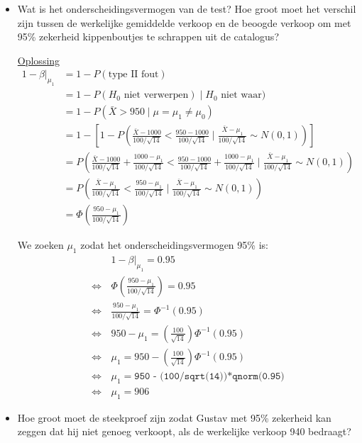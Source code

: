 \documentclass[kulak]{kulakarticle} %
\begin{document}
\begin{itemize}
	\item Wat is het onderscheidingsvermogen van de test? Hoe groot moet het verschil zijn tussen de werkelijke gemiddelde verkoop en de beoogde verkoop om met 95\% zekerheid kippenboutjes te schrappen uit de catalogus?

	\underline{Oplossing}
	\begin{align*}
		1-\beta |_{\mu_1} & = 1-P(\text{type II fout})                                                            \\
		        & = 1-P(H_0 \text{ niet verwerpen}) \mid H_0 \text{ niet waar})                         \\
		        & = 1-P\left(\bar{X}>950 \mid \mu = \mu_1 \neq \mu_0 \right)     \\
		        & = 1-\left[1-P\left(\frac{\bar{X}-1000}{100/\sqrt{14}}<\frac{950-1000}{100/\sqrt{14}} \mid \frac{\bar{X}-\mu_1}{100/\sqrt{14}}\sim N(0,1) \right)\right] \\
		        & = P\left(\frac{\bar{X}-1000}{100/\sqrt{14}}+\frac{1000-\mu_1}{100/\sqrt{14}}<\frac{950-1000}{100/\sqrt{14}}+\frac{1000-\mu_1}{100/\sqrt{14}} \mid \frac{\bar{X}-\mu_1}{100/\sqrt{14}}\sim N(0,1) \right) \\
		        & = P\left(\frac{\bar{X}-\mu_1}{100/\sqrt{14}} < \frac{950-\mu_1}{100/\sqrt{14}} \mid \frac{\bar{X}-\mu_1}{100/\sqrt{14}}\sim N(0,1) \right) \\
		        & = \Phi\left(\frac{950-\mu_1}{100/\sqrt{14}} \right)
	\end{align*}

	We zoeken \(\mu_1\) zodat het onderscheidingsvermogen 95\% is:
	\begin{align*}
		&1-\beta |_{\mu_1} = 0.95\\
		\Longleftrightarrow \, & \Phi\left(\frac{950-\mu_1}{100/\sqrt{14}} \right) = 0.95\\
		\Longleftrightarrow \, & \frac{950-\mu_1}{100/\sqrt{14}} = \Phi^{-1}(0.95) \\
		\Longleftrightarrow \, & 950-\mu_1 = \left(\frac{100}{\sqrt{14}}\right)\Phi^{-1}(0.95) \\
		\Longleftrightarrow \, & \mu_1 = 950 - \left(\frac{100}{\sqrt{14}}\right)\Phi^{-1}(0.95) \\
		\Longleftrightarrow \, & \mu_1 = \texttt{950 - (100/sqrt(14))*qnorm(0.95)} \\
		\Longleftrightarrow \, & \mu_1 = 906
	\end{align*}


	\item Hoe groot moet de steekproef zijn zodat Gustav met 95\% zekerheid kan zeggen dat hij niet genoeg verkoopt, als de werkelijke verkoop 940 bedraagt?


\end{itemize}
\end{document}

